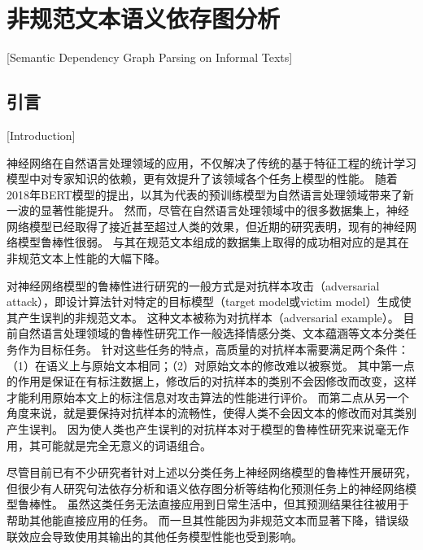 
\chapter[非规范文本语义依存图分析]{非规范文本语义依存图分析}[Semantic Dependency Graph Parsing on Informal Texts]

\section{引言}[Introduction]
\label{sec:chapter3-intro}

神经网络在自然语言处理领域的应用，不仅解决了传统的基于特征工程的统计学习模型中对专家知识的依赖，更有效提升了该领域各个任务上模型的性能\cite{chen-manning-2014-fast,chiu-nichols-2016-named,ma-hovy-2016-end,zhou-etal-2016-text,chopra-etal-2016-abstractive}。
随着2018年BERT模型的提出，以其为代表的预训练模型为自然语言处理领域带来了新一波的显著性能提升\cite{peters-etal-2018-deep,devlin-etal-2018-bert,yang-etal-2019-xlnet,clark-etal-2020-electra}。
然而，尽管在自然语言处理领域中的很多数据集上，神经网络模型已经取得了接近甚至超过人类的效果，但近期的研究表明，现有的神经网络模型鲁棒性很弱。
与其在规范文本组成的数据集上取得的成功相对应的是其在非规范文本上性能的大幅下降\cite{alzantot-etal-2018-generating, ren-etal-2019-generating, cheng-etal-2019-robust,michel-etal-2019-evaluation, jin-etal-2020-isbert}。

对神经网络模型的鲁棒性进行研究的一般方式是对抗样本攻击（adversarial attack），即设计算法针对特定的目标模型（target model或victim model）生成使其产生误判的非规范文本。
这种文本被称为对抗样本（adversarial example）。
目前自然语言处理领域的鲁棒性研究工作一般选择情感分类、文本蕴涵等文本分类任务作为目标任务。
针对这些任务的特点，高质量的对抗样本需要满足两个条件：（1）在语义上与原始文本相同；（2）对原始文本的修改难以被察觉。
其中第一点的作用是保证在有标注数据上，修改后的对抗样本的类别不会因修改而改变，这样才能利用原始本文上的标注信息对攻击算法的性能进行评价。
而第二点从另一个角度来说，就是要保持对抗样本的流畅性，使得人类不会因文本的修改而对其类别产生误判。
因为使人类也产生误判的对抗样本对于模型的鲁棒性研究来说毫无作用，其可能就是完全无意义的词语组合。

尽管目前已有不少研究者针对上述以分类任务上神经网络模型的鲁棒性开展研究，但很少有人研究句法依存分析和语义依存图分析等结构化预测任务上的神经网络模型鲁棒性。
虽然这类任务无法直接应用到日常生活中，但其预测结果往往被用于帮助其他能直接应用的任务。
而一旦其性能因为非规范文本而显著下降，错误级联效应会导致使用其输出的其他任务模型性能也受到影响。


